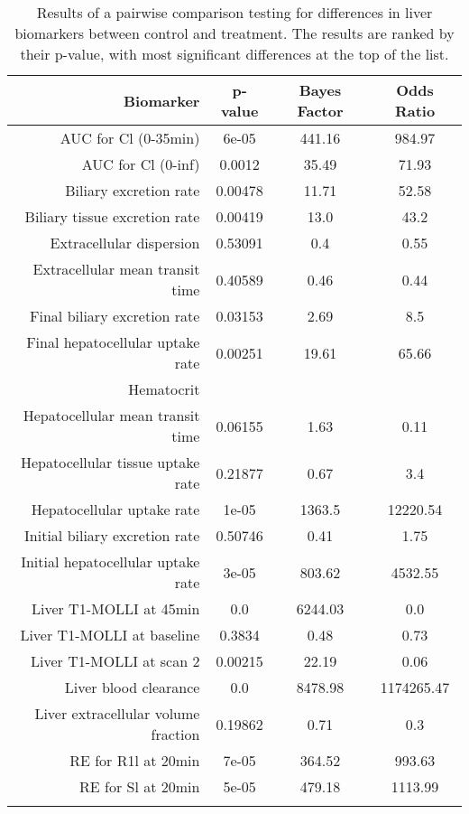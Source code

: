 \documentclass{epflreport}%
\begin{document}
%
\begin{longtable}{rccc}%
\hline%
Biomarker&p{-}value&Bayes Factor&Odds Ratio\\%
\hline%
AUC for Cl (0{-}35min)&6e{-}05&441.16&984.97\\%
AUC for Cl (0{-}inf)&0.0012&35.49&71.93\\%
Biliary excretion rate&0.00478&11.71&52.58\\%
Biliary tissue excretion rate&0.00419&13.0&43.2\\%
Extracellular dispersion&0.53091&0.4&0.55\\%
Extracellular mean transit time&0.40589&0.46&0.44\\%
Final biliary excretion rate&0.03153&2.69&8.5\\%
Final hepatocellular uptake rate&0.00251&19.61&65.66\\%
Hematocrit&&&\\%
Hepatocellular mean transit time&0.06155&1.63&0.11\\%
Hepatocellular tissue uptake rate&0.21877&0.67&3.4\\%
Hepatocellular uptake rate&1e{-}05&1363.5&12220.54\\%
Initial biliary excretion rate&0.50746&0.41&1.75\\%
Initial hepatocellular uptake rate&3e{-}05&803.62&4532.55\\%
Liver T1{-}MOLLI at 45min&0.0&6244.03&0.0\\%
Liver T1{-}MOLLI at baseline&0.3834&0.48&0.73\\%
Liver T1{-}MOLLI at scan 2&0.00215&22.19&0.06\\%
Liver blood clearance&0.0&8478.98&1174265.47\\%
Liver extracellular volume fraction&0.19862&0.71&0.3\\%
RE for R1l at 20min&7e{-}05&364.52&993.63\\%
RE for Sl at 20min&5e{-}05&479.18&1113.99\\%
\hline%
\caption{Results of a pairwise comparison testing for differences in liver biomarkers between control and treatment. The results are ranked by their p-value, with most significant differences at the top of the list.} \\%
\end{longtable}%
\end{document}
